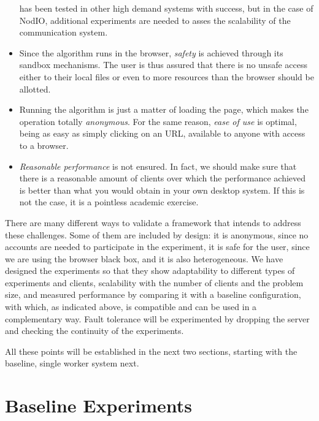\documentclass[journal,onecolumn]{IEEEtran}
\begin{document}
\begin{itemize}
  has been tested in other high demand systems with success, but 
  in the case of {\sf NodIO}, additional experiments are needed to asses 
  the scalability of the communication system. %
\item Since the algorithm runs in the browser, {\em safety} is
  achieved through its sandbox mechanisms. The user is thus assured
  that there is no unsafe access either to their local files or even
  to more resources than the browser should be allotted.
\item Running the algorithm is just a matter of loading the page,
  which makes the operation totally {\em anonymous}. For the same
  reason, {\em ease of use} is optimal, being as easy as simply
  clicking on an URL, available to anyone with access to a browser.
\item {\em Reasonable performance} is not ensured. In fact, we should
  make sure that there is a reasonable amount of clients over which
  the performance achieved is better than what you would obtain in
  your own desktop system. If this is not the case, it is a pointless
  academic exercise.
\end{itemize}

There are many different ways to validate a framework that intends to
address these challenges. Some of them are included by design: it is
anonymous, since no accounts are needed to participate in the
experiment, it is safe for the user, since we are using the browser
black box, and it is also heterogeneous. We have designed the
experiments so that they show adaptability to different types of
experiments and clients, scalability with the number of clients and
the problem size, and measured performance by comparing it with
a baseline configuration, with which, as indicated above, is
compatible and can be used in a complementary way. Fault tolerance
will be experimented by dropping the server and checking the continuity
of the experiments. 

All these points will be established in the next two sections,
starting with the baseline, single worker system next. 

\section{Baseline Experiments} %
\label{sec:experiments}
\end{document}
